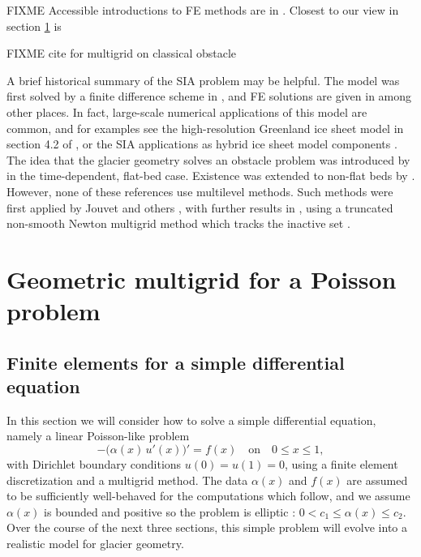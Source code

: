 \documentclass[letterpaper,final,12pt,reqno]{amsart}
\theoremstyle{claim}
\numberwithin{equation}{section}
\numberwithin{figure}{section}
\numberwithin{table}{section}
\numberwithin{theorem}{section}
\begin{document}
FIXME Accessible introductions to FE methods are in \cite{Bueler2021,Elmanetal2014,Johnson2009}.  Closest to our view in section \ref{sec:subspace} is \cite[Chapter V]{Braess2007}

FIXME cite for multigrid on classical obstacle \cite{BrandtCryer1983,Bueler2021,GraeserKornhuber2009}

A brief historical summary of the SIA problem may be helpful.  The model was first solved by a finite difference scheme in \cite{Mahaffy1976}, and FE solutions are given in \cite{Calvoetal2002,JouvetBueler2012} among other places.  In fact, large-scale numerical applications of this model are common, and for examples see the high-resolution Greenland ice sheet model in section 4.2 of \cite{Bueler2016}, or the SIA applications as hybrid ice sheet model components \cite[for example]{Winkelmannetal2011}.  The idea that the glacier geometry solves an obstacle problem was introduced by \cite{Calvoetal2002} in the time-dependent, flat-bed case.  Existence was extended to non-flat beds by \cite{JouvetBueler2012}.  However, none of these references use multilevel methods.  Such methods were first applied by Jouvet and others \cite{Jouvetetal2013}, with further results in \cite{JouvetGraeser2013}, using a truncated non-smooth Newton multigrid method which tracks the inactive set \cite{GraeserKornhuber2009}.


\section{Geometric multigrid for a Poisson problem} \label{sec:subspace}

\subsection{Finite elements for a simple differential equation} \label{subsec:poissonfe}  In this section we will consider how to solve a simple differential equation, namely a linear Poisson-like problem
\begin{equation}
- \big(\alpha(x)\,u'(x)\big)' = f(x) \quad \text{on} \quad 0 \le x \le 1, \label{eq:poisson}
\end{equation}
with Dirichlet boundary conditions $u(0)=u(1)=0$, using a finite element discretization and a multigrid method.  The data $\alpha(x)$ and $f(x)$ are assumed to be sufficiently well-behaved for the computations which follow, and we assume $\alpha(x)$ is bounded and positive so the problem is elliptic \cite{Evans2010}: $0 < c_1 \le \alpha(x) \le c_2$.  Over the course of the next three sections, this simple problem will evolve into a realistic model for glacier geometry.
\end{document}

